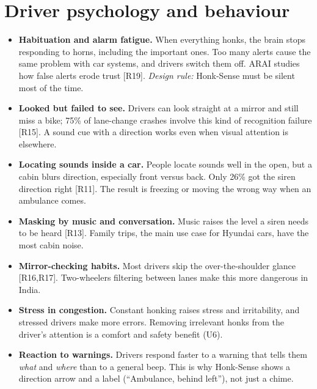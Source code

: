 \documentclass[11pt]{article}
\renewcommand{\cite}[1]{{\color{navy}[#1]}}
\begin{document}
\section{Driver psychology and behaviour}
\begin{itemize}[leftmargin=*]
  \item \textbf{Habituation and alarm fatigue.} When everything honks, the brain stops responding to horns, including the important ones. Too many alerts cause the same problem with car systems, and drivers switch them off. ARAI studies how false alerts erode trust \cite{R19}. \emph{Design rule:} Honk-Sense must be silent most of the time.
  \item \textbf{Looked but failed to see.} Drivers can look straight at a mirror and still miss a bike; 75\% of lane-change crashes involve this kind of recognition failure \cite{R15}. A sound cue with a direction works even when visual attention is elsewhere.
  \item \textbf{Locating sounds inside a car.} People locate sounds well in the open, but a cabin blurs direction, especially front versus back. Only 26\% got the siren direction right \cite{R11}. The result is freezing or moving the wrong way when an ambulance comes.
  \item \textbf{Masking by music and conversation.} Music raises the level a siren needs to be heard \cite{R13}. Family trips, the main use case for Hyundai cars, have the most cabin noise.
  \item \textbf{Mirror-checking habits.} Most drivers skip the over-the-shoulder glance \cite{R16,R17}. Two-wheelers filtering between lanes make this more dangerous in India.
  \item \textbf{Stress in congestion.} Constant honking raises stress and irritability, and stressed drivers make more errors. Removing irrelevant honks from the driver's attention is a comfort and safety benefit (U6).
  \item \textbf{Reaction to warnings.} Drivers respond faster to a warning that tells them \emph{what} and \emph{where} than to a general beep. This is why Honk-Sense shows a direction arrow and a label (``Ambulance, behind left''), not just a chime.
\end{itemize}
\end{document}
